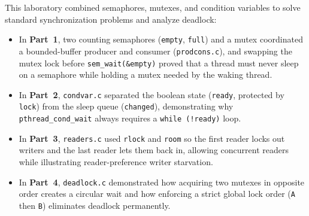 \documentclass{../latex/utmreport}
\providecommand{\tightlist}{\setlength{\itemsep}{0pt}\setlength{\parskip}{0pt}}
\begin{document}
\utmconclusions

This laboratory combined semaphores, mutexes, and condition variables to solve standard synchronization problems and analyze deadlock:
\begin{itemize}
\tightlist
\item In \textbf{Part~1}, two counting semaphores (\texttt{empty}, \texttt{full}) and a mutex coordinated a bounded-buffer producer and consumer (\texttt{prodcons.c}), and swapping the mutex lock before \texttt{sem\_wait(\&empty)} proved that a thread must never sleep on a semaphore while holding a mutex needed by the waking thread.
\item In \textbf{Part~2}, \texttt{condvar.c} separated the boolean state (\texttt{ready}, protected by \texttt{lock}) from the sleep queue (\texttt{changed}), demonstrating why \texttt{pthread\_cond\_wait} always requires a \texttt{while (!ready)} loop.
\item In \textbf{Part~3}, \texttt{readers.c} used \texttt{rlock} and \texttt{room} so the first reader locks out writers and the last reader lets them back in, allowing concurrent readers while illustrating reader-preference writer starvation.
\item In \textbf{Part~4}, \texttt{deadlock.c} demonstrated how acquiring two mutexes in opposite order creates a circular wait and how enforcing a strict global lock order (\texttt{A} then \texttt{B}) eliminates deadlock permanently.
\end{itemize}
\end{document}
